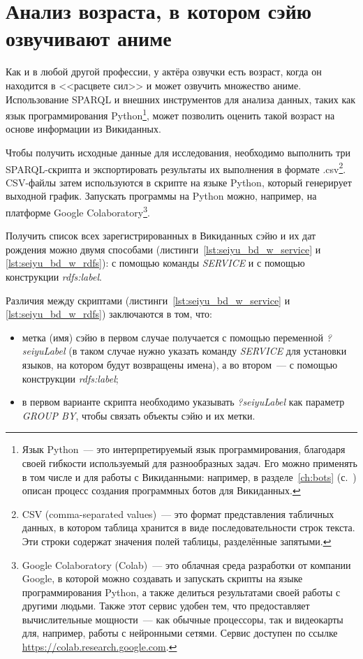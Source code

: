 \section{Анализ возраста, в котором сэйю озвучивают аниме}

Как и в любой другой профессии, у актёра озвучки есть возраст, когда он находится в <<расцвете сил>> и может озвучить множество аниме. Использование SPARQL и внешних инструментов для анализа данных, таких как язык программирования Python\footnote{Язык Python~--- это интерпретируемый язык программирования, благодаря своей гибкости используемый для разнообразных задач. Его можно применять в том числе и для работы с Викиданными: например, в разделе~\ref{ch:bots} (с.~\pageref{ch:bots}) описан процесс создания программных ботов для Викиданных.}, может позволить оценить такой возраст на основе информации из Викиданных.

Чтобы получить исходные данные для исследования, необходимо выполнить три SPARQL-скрипта и экспортировать результаты их выполнения в формате .csv\footnote{CSV (comma-separated values)~--- это формат представления табличных данных, в котором таблица хранится в виде последовательности строк текста. Эти строки содержат значения полей таблицы, разделённые запятыми.}. CSV-файлы затем используются в скрипте на языке Python, который генерирует выходной график. Запускать программы на Python можно, например, на платформе Google Colaboratory\footnote{Google Colaboratory (Colab)~--- это облачная среда разработки от компании Google, в которой можно создавать и запускать скрипты на языке программирования Python, а также делиться результатами своей работы с другими людьми. Также этот сервис удобен тем, что предоставляет вычислительные мощности~--- как обычные процессоры, так и видеокарты для, например, работы с нейронными сетями. Сервис доступен по ссылке \href{https://colab.research.google.com}{https://colab.research.google.com}.}.

Получить список всех зарегистрированных в Викиданных сэйю и их дат рождения можно двумя способами (листинги~\ref{lst:seiyu_bd_w_service} и \ref{lst:seiyu_bd_w_rdfs}): с помощью команды \emph{SERVICE} и с помощью конструкции \emph{rdfs:label}.

Различия между скриптами (листинги~\ref{lst:seiyu_bd_w_service} и \ref{lst:seiyu_bd_w_rdfs}) заключаются в том, что:

\begin{itemize}
    \item метка (имя) сэйю в первом случае получается с помощью переменной \emph{?seiyuLabel} (в таком случае нужно указать команду \emph{SERVICE} для установки языков, на котором будут возвращены имена), а во втором~--- с помощью конструкции \emph{rdfs:label};
    \item в первом варианте скрипта необходимо указывать \emph{?seiyuLabel} как параметр \emph{GROUP BY}, чтобы связать объекты сэйю и их метки.
\end{itemize}

